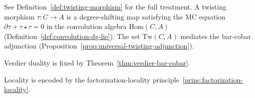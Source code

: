 \begin{definition}\label{def:twisting-morphism-index}
See Definition~\ref{def:twisting-morphism} for the full treatment.
A twisting morphism $\tau\colon C \to A$ is a degree-shifting map
satisfying the MC equation $\partial\tau + \tau \star \tau = 0$ in
the convolution algebra $\mathrm{Hom}(C, A)$
(Definition~\ref{def:convolution-dg-lie}).  The set $\mathrm{Tw}(C, A)$
mediates the bar-cobar adjunction
(Proposition~\ref{prop:universal-twisting-adjunction}).
\end{definition}

\begin{definition}\label{def:verdier-functor}
Verdier duality is fixed by Theorem~\ref{thm:verdier-bar-cobar}.
\end{definition}

\begin{definition}\label{def:locality}
Locality is encoded by the factorization-locality principle~\ref{princ:factorization-locality}.
\end{definition}

